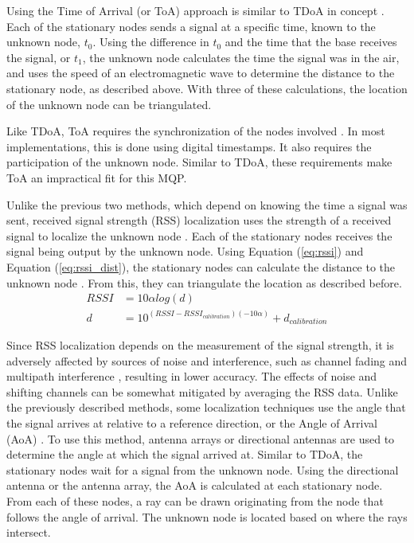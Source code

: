 Using the Time of Arrival (or ToA) approach is similar to TDoA in concept \cite{local_conf}. Each of the stationary nodes sends a signal at a specific time, known to the unknown node, $t_0$. Using the difference in $t_0$ and the time that the base receives the signal, or $t_1$, the unknown node calculates the time the signal was in the air, and uses the speed of an electromagnetic wave to determine the distance to the stationary node, as described above. With three of these calculations, the location of the unknown node can be triangulated.\par

Like TDoA, ToA requires the synchronization of the nodes involved \cite{local_conf}. In most implementations, this is done using digital timestamps. It also requires the participation of the unknown node. Similar to TDoA, these requirements make ToA an impractical fit for this MQP. \par

Unlike the previous two methods, which depend on knowing the time a signal was sent, received signal strength (RSS) localization uses the strength of a received signal to localize the unknown node \cite{local_conf}. Each of the stationary nodes receives the signal being output by the unknown node. Using Equation (\ref{eq:rssi}) and Equation (\ref{eq:rssi_dist}), the stationary nodes can calculate the distance to the unknown node \cite{rss_calc}. From this, they can triangulate the location as described before.
\begin{align}
\label{eq:rssi} RSSI &= 10\alpha log(d) \\ 
\label{eq:rssi_dist} d &= 10^{(RSSI-RSSI_{calibration})(-10\alpha)} + d_{calibration}
\end{align}
\par
Since RSS localization depends on the measurement of the signal strength, it is adversely affected by sources of noise and interference, such as channel fading and multipath interference \cite{local_conf}, resulting in lower accuracy. The effects of noise and shifting channels can be somewhat mitigated by averaging the RSS data.
Unlike the previously described methods, some localization techniques use the angle that the signal arrives at relative to a reference direction, or the Angle of Arrival (AoA) \cite{local_aoa}. To use this method, antenna arrays or directional antennas are used to determine the angle at which the signal arrived at. Similar to TDoA, the stationary nodes wait for a signal from the unknown node. Using the directional antenna or the antenna array, the AoA is calculated at each stationary node. From each of these nodes, a ray can be drawn originating from the node that follows the angle of arrival. The unknown node is located based on where the rays intersect.

